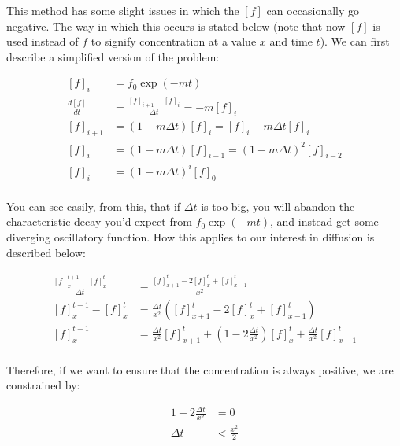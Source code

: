\documentclass[12pt]{amsart}
\newcommand{\pr}[1]{\left(#1\right)}
\begin{document}
This method has some slight issues in which the $[f]$ can occasionally go negative. The way in which this occurs is stated below (note that now $[f]$ is used instead of $f$ to signify concentration at a value $x$ and time $t$). We can first describe a simplified version of the problem:\newline

\begin{equation} \label{eq8}
\begin{split}
[f]_i & = f_0\exp(-mt) \\
\frac{d[f]}{dt} & = \frac{[f]_{i+1} - [f]_{i}}{\Delta t} = -m[f]_i \\
[f]_{i+1} & = (1-m\Delta t)[f]_i = [f]_i - m\Delta t [f]_i \\
[f]_{i} & = (1-m\Delta t)[f]_{i-1} = (1-m\Delta t)^2[f]_{i-2} \\
[f]_{i} & = (1-m\Delta t)^i[f]_{0} \\
\end{split}
\end{equation}

You can see easily, from this, that if $\Delta t$ is too big, you will abandon the characteristic decay you'd expect from $f_0\exp(-mt)$, and instead get some diverging oscillatory function. How this applies to our interest in diffusion is described below: 

\begin{equation} \label{eq8}
\begin{split}
\frac{[f]^{t+1}_{x} - [f]^{t}_{x}}{\Delta t} &= \frac{[f]^{t}_{x+1} - 2[f]^{t}_x + [f]^{t}_{x - 1}}{x^2}\\
[f]^{t+1}_{x} - [f]^{t}_{x} &= \frac{\Delta t}{x^2} \pr{[f]^{t}_{x+1} - 2[f]^{t}_x + [f]^{t}_{x - 1}} \\
[f]^{t+1}_{x} &= \frac{\Delta t}{x^2} [f]^{t}_{x+1} + \pr{1 - 2\frac{\Delta t}{x^2}}[f]^{t}_x + \frac{\Delta t}{x^2}[f]^{t}_{x - 1} \\
\end{split}
\end{equation}

Therefore, if we want to ensure that the concentration is always positive, we are constrained by: 

\begin{equation} \label{eq8}
\begin{split}
1 - 2\frac{\Delta t}{x^2} & = 0\\
\Delta t & < \frac{x^2}{2}\\
\end{split}
\end{equation}
\end{document}
